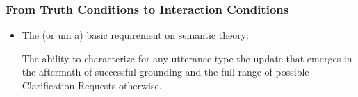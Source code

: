 \documentclass{beamer}
\begin{document}
\begin{frame}
\frametitle{From Truth Conditions to Interaction Conditions }

\begin{itemize}
\item The (or um a) basic requirement
on semantic theory:


 \textcolor[rgb]{0.98,0.00,0.00}{The
  ability to characterize for any utterance type the update that
  emerges in the aftermath of successful grounding and the full range
  of possible Clarification Requests otherwise}.


\end{itemize}

\end{frame}





\end{document}
